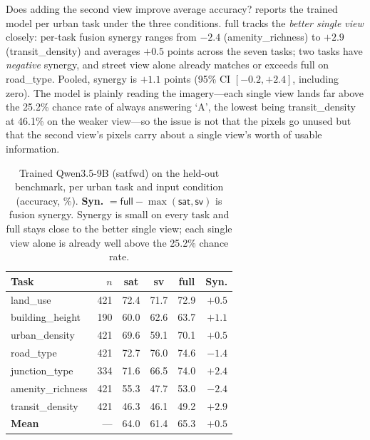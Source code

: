 Does adding the second view improve average accuracy? 
reports the trained model per urban task under the three conditions. \textsf{full}
tracks the \emph{better single view} closely: per-task fusion synergy ranges from
$-\num{2.4}$ (\textsf{amenity\_richness}) to $+\num{2.9}$ (\textsf{transit\_density})
and averages $+\num{0.5}$ points across the seven tasks; two tasks have
\emph{negative} synergy, and street view alone already matches or exceeds
\textsf{full} on \textsf{road\_type}. Pooled, synergy is $+\num{1.1}$ points
(\num{95}\% CI $[-\num{0.2},+\num{2.4}]$, including zero). The model is plainly
reading the imagery---each single view lands far above the \num{25.2}\% chance rate
of always answering `A', the lowest being \textsf{transit\_density} at \num{46.1}\%
on the weaker view---so the issue is not that the pixels go unused but that the
second view's pixels carry about a single view's worth of usable information.

\begin{table}[t]
  \centering
  \caption{Trained Qwen3.5-9B (\textsf{satfwd}) on the held-out benchmark, per urban
  task and input condition (accuracy, \%). \textbf{Syn.}
  $=\textsf{full}-\max(\textsf{sat},\textsf{sv})$ is fusion synergy. Synergy is small
  on every task and \textsf{full} stays close to the better single view; each single
  view alone is already well above the \num{25.2}\% chance rate.}
  \label{tab:fusion-main}
  \setlength{\tabcolsep}{6pt}
  \begin{tabular}{@{}lrcccr@{}}
    \toprule
    Task & $n$ & sat & sv & full & Syn. \\
    \midrule
    land\_use         & 421 & 72.4 & 71.7 & 72.9 & $+0.5$ \\
    building\_height  & 190 & 60.0 & 62.6 & 63.7 & $+1.1$ \\
    urban\_density    & 421 & 69.6 & 59.1 & 70.1 & $+0.5$ \\
    road\_type        & 421 & 72.7 & 76.0 & 74.6 & $-1.4$ \\
    junction\_type    & 334 & 71.6 & 66.5 & 74.0 & $+2.4$ \\
    amenity\_richness & 421 & 55.3 & 47.7 & 53.0 & $-2.4$ \\
    transit\_density  & 421 & 46.3 & 46.1 & 49.2 & $+2.9$ \\
    \midrule
    \textbf{Mean}     & --- & 64.0 & 61.4 & 65.3 & $\mathbf{+0.5}$ \\
    \bottomrule
  \end{tabular}
\end{table}


